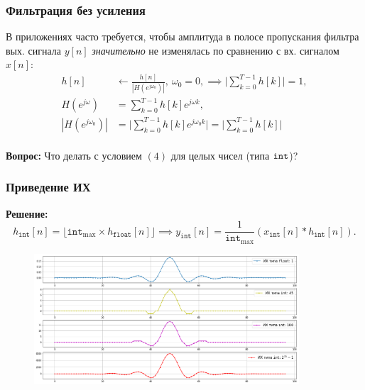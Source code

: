 \documentclass{beamer}
\begin{document}
    \begin{frame}[fragile]
        \frametitle{Фильтрация без усиления}
        \justifying
        В приложениях часто требуется, чтобы амплитуда в полосе пропускания фильтра вых. сигнала $y[n]$ {\it значительно} не изменялась по сравнению с вх. сигналом $x[n]$:
        \begin{equation}
        \begin{split}
            h[n] &\leftarrow \frac{h[n]}{|H(e^{j\omega_{0}})|},\ \omega_{0} = 0, \implies \Biggl\lvert \sum_{k=0}^{T-1} h[k] \Biggr\lvert = 1, \\
            H(e^{j\omega}) &= \sum_{k=0}^{T-1} h[k]e^{j\omega k},\\
            |H(e^{j\omega_{0}})| &= \Biggl\lvert \sum_{k=0}^{T-1} h[k]e^{j\omega_{0} k} \Biggr\lvert = \Biggl\lvert \sum_{k=0}^{T-1} h[k] \Biggr\lvert \\
        \end{split}
        \end{equation}
        \par
        {\bf Вопрос:} Что делать с условием $(4)$ для целых чисел (типа ${\tt int}$)? 
    \end{frame}
    \begin{frame}
        \frametitle{Приведение ИХ}
        {\bf Решение:} $$h_{\texttt{int}}[n] = \big\lfloor \texttt{int}_{\textrm{max}} \times  h_{\texttt{float}}[n] \big\rfloor \implies y_{\texttt{int}}[n] = \frac{1}{\texttt{int}_{\textrm{max}}}(x_{\texttt{int}}[n] * h_{\texttt{int}}[n]).$$
        \begin{figure}[!tbp]
           \centering
           \includegraphics[width=0.88\textwidth]{pics/IR.png}
           \captionsetup{justification=centering}
       \end{figure}
    \end{frame}
\end{document}
